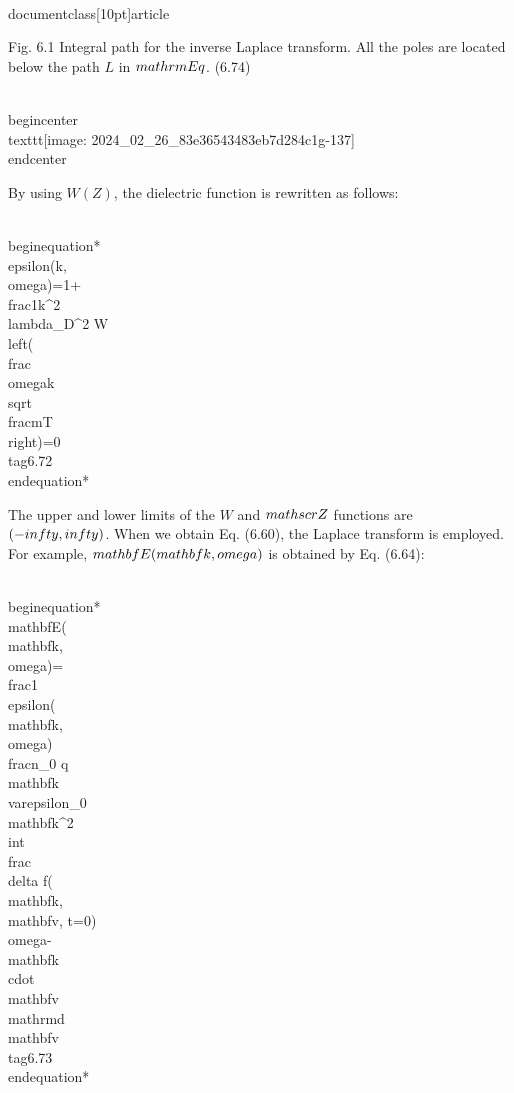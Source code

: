 \\documentclass[10pt]{article}
\begin{document}
{{{{Fig. 6.1 Integral path for the inverse Laplace transform. All the poles are located below the path $L$ in $\\mathrm{Eq}$. (6.74)

\\begin{center}
\\texttt{[image: 2024\_02\_26\_83e36543483eb7d284c1g-137]}
\\end{center}

By using $W(Z)$, the dielectric function is rewritten as follows:


\\begin{equation*}
\\epsilon(k, \\omega)=1+\\frac{1}{k^{2} \\lambda_{D}^{2}} W\\left(\\frac{\\omega}{k} \\sqrt{\\frac{m}{T}}\\right)=0 \\tag{6.72}
\\end{equation*}


The upper and lower limits of the $W$ and $\\mathscr{Z}$ functions are $(-\\infty, \\infty)$. When we obtain Eq. (6.60), the Laplace transform is employed. For example, $\\mathbf{E}(\\mathbf{k}, \\omega)$ is obtained by Eq. (6.64):


\\begin{equation*}
\\mathbf{E}(\\mathbf{k}, \\omega)=\\frac{1}{\\epsilon(\\mathbf{k}, \\omega)} \\frac{n_{0} q \\mathbf{k}}{\\varepsilon_{0} \\mathbf{k}^{2}} \\int \\frac{\\delta f(\\mathbf{k}, \\mathbf{v}, t=0)}{\\omega-\\mathbf{k} \\cdot \\mathbf{v}} \\mathrm{d} \\mathbf{v} \\tag{6.73}
\\end{equation*}


}}}}
\end{document}
